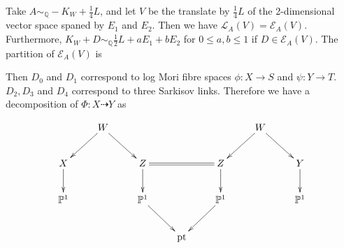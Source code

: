 \documentclass[11pt]{amsart}
\begin{document}
Take $A\sim_{\mathbb{Q}}-K_{W}+\frac{1}{4}L$, and let $V$ be the translate by  $\frac{1}{4}L$ of the 2-dimensional vector space spaned by $E_{1}$ and  $E_{2}$. Then we have $\mathcal{L}_{A}(V)=\mathcal{E}_{A}(V)$. Furthermore,  $K_{W}+D\sim_{\mathbb{Q}} \frac{1}{2}L+aE_{1}+bE_{2}$ for $0\leqslant a,b\leqslant 1$ if $D \in \mathcal{E}_{A}(V)$. The partition of $\mathcal{E}_{A}(V)$ is
\begin{center}
\end{center}
Then $D_{0}$ and $D_{1}$ correspond to log Mori fibre spaces $\phi:X\to S$ and $\psi:Y\to T$. $D_{2},D_{3}$ and $D_{4}$ correspond to three Sarkisov links. Therefore we have a decomposition of $\Phi:X\dashrightarrow  Y$ as

\[
  \xymatrix{
     &W\ar[ld]\ar[rd] &&&&W\ar[ld]\ar[rd] \\
    X\ar[d]& &Z\ar[d]\ar@{=}[rr]&&Z\ar[d]&&Y\ar[d]\\
    \mathbb{P}^{1}&&\mathbb{P}^{1}\ar[dr]&&\mathbb{P}^{1}\ar[dl]&&\mathbb{P}^{1}\\
                  &&&\text{pt} 
  }
\]
\end{document}
